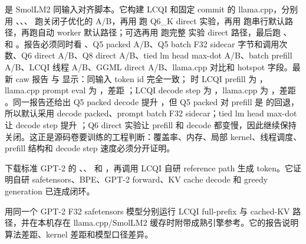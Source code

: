  是 SmolLM2 同输入对齐脚本。它构建 LCQI 和固定 commit 的 llama.cpp，分别用 、、、 跑关闭子优化的 A/B，再用  跑 Q6\_K direct 实验，再用  跑串行默认路径，再跑自动 worker 默认路径；可选再用  跑完整  实验 direct 路径，最后跑 、 和 。报告必须同时看 、Q5 packed A/B、Q5 batch F32 sidecar 字节和调用次数、Q6 direct A/B、Q8 direct A/B、tied lm head max-dot A/B、batch prefill A/B、LCQI 线程 A/B、GGML direct A/B、llama.cpp 对比和 hotspot 字段。最新 caw 报告  与  显示：同输入 token id 完全一致； 时 LCQI prefill 为 ，llama.cpp prompt eval 为 ，差距 ；LCQI decode step 为 ，llama.cpp 为 ，差距 。同一报告还给出 Q5 packed decode 提升 ，但 Q5 packed 对 prefill 是  的回退，所以默认采用 decode packed、prompt batch F32 sidecar；tied lm head max-dot 让 decode step 提升 ；Q6 direct 实验让 prefill 和 decode 都变慢，因此继续保持关闭。这正是源码卷要训练的工程判断：覆盖率、内存、局部 kernel、线程调度、prefill 结构和 decode step 速度必须分开证明。



 下载标准 GPT-2 的 、、 和 ，再调用 LCQI 自研  reference path 生成 token。它证明自研 safetensors、BPE、GPT-2 forward、KV cache decode 和 greedy generation 已连成闭环。



 用同一个 GPT-2 F32 safetensors 模型分别运行 LCQI full-prefix 与 cached-KV 路径，并在本机存在 llama.cpp/SmolLM2 缓存时附带成熟引擎参考。它的报告说明算法差距、kernel 差距和模型口径差异。

